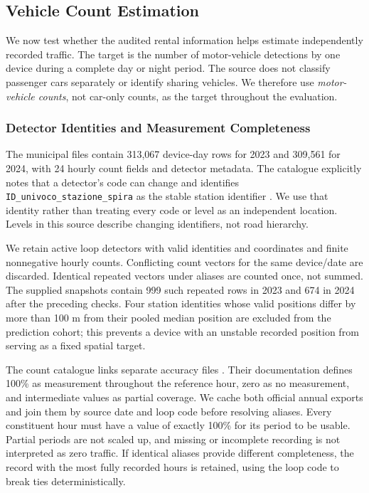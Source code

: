 \documentclass{interact}
\begin{document}
\subsection{Vehicle Count Estimation}
\label{sec:counts}
We now test whether the audited rental information helps estimate independently recorded traffic. The target is the number of motor-vehicle detections by one device during a complete day or night period. The source does not classify passenger cars separately or identify sharing vehicles. We therefore use \emph{motor-vehicle counts}, not car-only counts, as the target throughout the evaluation.

\subsubsection{Detector Identities and Measurement Completeness}
The municipal files contain 313,067 device-day rows for 2023 and 309,561 for 2024, with 24 hourly count fields and detector metadata. The catalogue explicitly notes that a detector's code can change and identifies \texttt{ID\_univoco\_stazione\_spira} as the stable station identifier \citep{bolognaLoops}. We use that identity rather than treating every code or level as an independent location. Levels in this source describe changing identifiers, not road hierarchy.

We retain active loop detectors with valid identities and coordinates and finite nonnegative hourly counts. Conflicting count vectors for the same device/date are discarded. Identical repeated vectors under aliases are counted once, not summed. The supplied snapshots contain 999 such repeated rows in 2023 and 674 in 2024 after the preceding checks. Four station identities whose valid positions differ by more than 100 m from their pooled median position are excluded from the prediction cohort; this prevents a device with an unstable recorded position from serving as a fixed spatial target.

\begin{table}[t]
\caption{Detector audit. The first exclusions refer to device-day rows; completeness exclusions refer separately to candidate day and night periods. Final site eligibility is applied afterwards.}
\label{tab:counter-audit}\centering\scriptsize

\end{table}

The count catalogue links separate accuracy files \citep{bolognaAccuracy}. Their documentation defines 100\%{} as measurement throughout the reference hour, zero as no measurement, and intermediate values as partial coverage. We cache both official annual exports and join them by source date and loop code before resolving aliases. Every constituent hour must have a value of exactly 100\%{} for its period to be usable. Partial periods are not scaled up, and missing or incomplete recording is not interpreted as zero traffic. If identical aliases provide different completeness, the record with the most fully recorded hours is retained, using the loop code to break ties deterministically.
\end{document}
